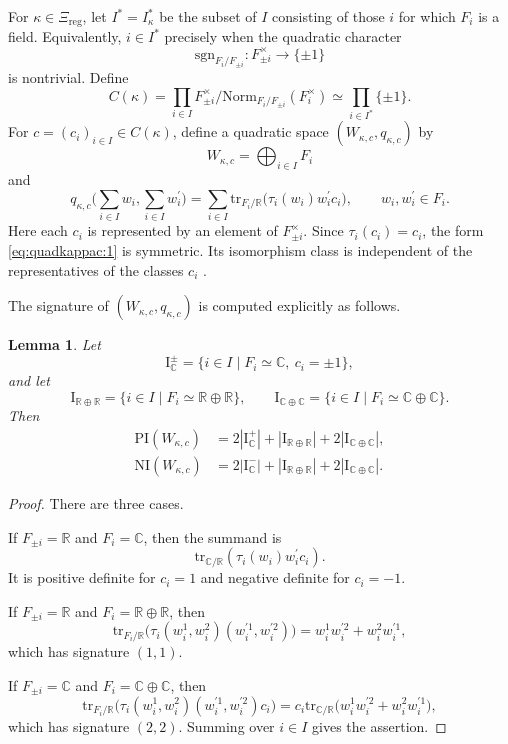 \documentclass[12pt]{amsart}
\numberwithin{equation}{subsection}
\newcommand{\BC}{{\mathbb {C}}}
\newcommand{\BR}{{\mathbb {R}}}
\newcommand{\RI}{{\mathrm {I}}}
\newcommand{\reg}{{\mathrm{reg}}}
\newcommand{\sgn}{{\mathrm{sgn}}}
\newcommand{\tr}{{\mathrm{tr}}}
\def\p{\prime}
\def\PI{\mathrm{PI}}
\def\NI{\mathrm{NI}}
\def\Norm{\mathrm{Norm}}
\newtheorem{lem}[thm]{Lemma}
\begin{document}
For $\kappa\in \Xi_\reg$, let $I^*=I^*_\kappa$ be the subset of $I$ consisting
of those $i$ for which $F_i$ is a field. Equivalently, $i\in I^*$ precisely
when the quadratic character
\[
\sgn_{F_i/F_{\pm i}}:F_{\pm i}^\times\to \{\pm 1\}
\]
is nontrivial. Define
\[
C(\kappa)
=
\prod_{i\in I}
F^\times_{\pm i}/\Norm_{F_i/F_{\pm i}}(F_i^\times)
\simeq
\prod_{i\in I^*}\{\pm 1\}.
\]
For $c=(c_i)_{i\in I}\in C(\kappa)$, define a quadratic space
$(W_{\kappa,c},q_{\kappa,c})$ by
\[
W_{\kappa,c}=\bigoplus_{i\in I}F_i
\]
and
\begin{equation}\label{eq:quadkappac:1}
q_{\kappa,c}
\bigg(
\sum_{i\in I}w_i,
\sum_{i\in I}w_i^\p
\bigg)
=
\sum_{i\in I}
\tr_{F_i/\BR}\big(\tau_i(w_i)w_i^\p c_i\big),
\qquad
w_i,w_i^\p\in F_i.
\end{equation}
Here each $c_i$ is represented by an element of $F_{\pm i}^\times$. Since
$\tau_i(c_i)=c_i$, the form \eqref{eq:quadkappac:1} is symmetric. Its
isomorphism class is independent of the representatives of the classes $c_i$
\cite[\S 1.3]{MR2672539}.

The signature of $(W_{\kappa,c},q_{\kappa,c})$ is computed explicitly as
follows.

\begin{lem}\label{lem:positivenegativeindex}
Let
\[
\RI^\pm_{\BC}
=
\{i\in I\mid F_i\simeq \BC,\ c_i=\pm 1\},
\]
and let
\[
\RI_{\BR\oplus \BR}
=
\{i\in I\mid F_i\simeq \BR\oplus \BR\},
\qquad
\RI_{\BC\oplus \BC}
=
\{i\in I\mid F_i\simeq \BC\oplus \BC\}.
\]
Then
\begin{align*}
\PI(W_{\kappa,c})
&=
2|\RI^+_\BC|
+
|\RI_{\BR\oplus \BR}|
+
2|\RI_{\BC\oplus \BC}|,\\
\NI(W_{\kappa,c})
&=
2|\RI^-_\BC|
+
|\RI_{\BR\oplus \BR}|
+
2|\RI_{\BC\oplus \BC}|.
\end{align*}
\end{lem}

\begin{proof}
There are three cases.

If $F_{\pm i}=\BR$ and $F_i=\BC$, then the summand is
\[
\tr_{\BC/\BR}(\tau_i(w_i)w_i^\p c_i).
\]
It is positive definite for $c_i=1$ and negative definite for $c_i=-1$.

If $F_{\pm i}=\BR$ and $F_i=\BR\oplus \BR$, then
\[
\tr_{F_i/\BR}\big(\tau_i(w_i^1,w_i^2)(w_i^{\p 1},w_i^{\p 2})\big)
=
w_i^1w_i^{\p 2}+w_i^2w_i^{\p 1},
\]
which has signature $(1,1)$.

If $F_{\pm i}=\BC$ and $F_i=\BC\oplus \BC$, then
\[
\tr_{F_i/\BR}
\big(\tau_i(w_i^1,w_i^2)(w_i^{\p 1},w_i^{\p 2})c_i\big)
=
c_i\tr_{\BC/\BR}
\big(w_i^1w_i^{\p 2}+w_i^2w_i^{\p 1}\big),
\]
which has signature $(2,2)$. Summing over $i\in I$ gives the assertion.
\end{proof}
\end{document}
